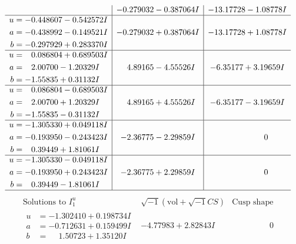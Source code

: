 \documentclass[1p]{elsarticle_modified}
\theoremstyle{definition}
\newcommand{\I}{\sqrt{-1}}
\begin{document}
$$\begin{array}{c|c|c}
 & -0.279032 - 0.387064 I & -13.17728 - 1.08778 I \\ \hline\begin{aligned}
u &= -0.448607 - 0.542572 I \\
a &= -0.438992 - 0.149521 I \\
b &= -0.297929 + 0.283370 I\end{aligned}
 & -0.279032 + 0.387064 I & -13.17728 + 1.08778 I \\ \hline\begin{aligned}
u &= \phantom{-}0.086804 + 0.689503 I \\
a &= \phantom{-}2.00700 - 1.20329 I \\
b &= -1.55835 + 0.31132 I\end{aligned}
 & \phantom{-}4.89165 - 4.55526 I & -6.35177 + 3.19659 I \\ \hline\begin{aligned}
u &= \phantom{-}0.086804 - 0.689503 I \\
a &= \phantom{-}2.00700 + 1.20329 I \\
b &= -1.55835 - 0.31132 I\end{aligned}
 & \phantom{-}4.89165 + 4.55526 I & -6.35177 - 3.19659 I \\ \hline\begin{aligned}
u &= -1.305330 + 0.049118 I \\
a &= -0.193950 - 0.243423 I \\
b &= \phantom{-}0.39449 + 1.81061 I\end{aligned}
 & -2.36775 - 2.29859 I & \phantom{-0.000000 } 0 \\ \hline\begin{aligned}
u &= -1.305330 - 0.049118 I \\
a &= -0.193950 + 0.243423 I \\
b &= \phantom{-}0.39449 - 1.81061 I\end{aligned}
 & -2.36775 + 2.29859 I & \phantom{-0.000000 } 0\\
 \hline 
 \end{array}$$\newpage$$\begin{array}{c|c|c}  
\text{Solutions to }I^u_{1}& \I (\text{vol} + \sqrt{-1}CS) & \text{Cusp shape}\\
 \hline 
\begin{aligned}
u &= -1.302410 + 0.198734 I \\
a &= -0.712631 + 0.159499 I \\
b &= \phantom{-}1.50723 + 1.35120 I\end{aligned}
 & -4.77983 + 2.82843 I & \phantom{-0.000000 } 0 \\ \hline\begin{aligned}

\end{aligned}
\end{array}$$
\end{document}
